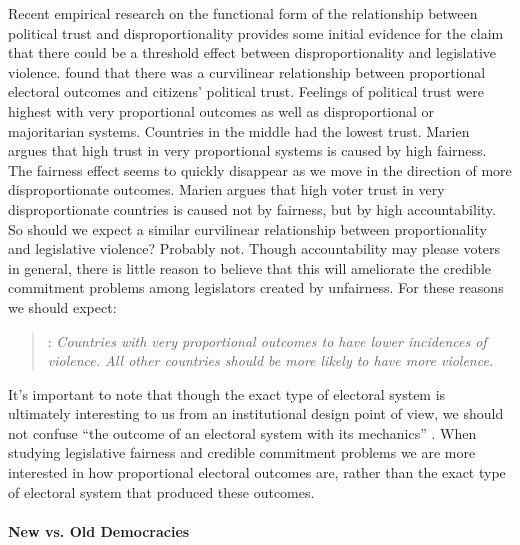 \documentclass[a4paper]{article}\usepackage[]{graphicx}\usepackage[]{color}
\begin{document}
Recent empirical research on the functional form of the relationship between political trust and disproportionality provides some initial evidence for the claim that there could be a threshold effect between disproportionality and legislative violence. \cite{Marien2011} found that there was a curvilinear relationship between proportional electoral outcomes and citizens' political trust. Feelings of political trust were highest with very proportional outcomes as well as disproportional or majoritarian systems. Countries in the middle had the lowest trust. Marien argues that high trust in very proportional systems is caused by high fairness. The fairness effect seems to quickly disappear as we move in the direction of more disproportionate outcomes. Marien argues that high voter trust in very disproportionate countries is caused not by fairness, but by high accountability. So should we expect a similar curvilinear relationship between proportionality and legislative violence? Probably not. Though accountability may please voters in general, there is little reason to believe that this will ameliorate the credible commitment problems among legislators created by unfairness. For these reasons we should expect:

\begin{quote}
    : \emph{Countries with very proportional outcomes to have lower incidences of violence. All other countries should be more likely to have more violence.}
\end{quote}

It's important to note that though the exact type of electoral system is ultimately interesting to us from an institutional design point of view, we should not confuse ``the outcome of an electoral system with its mechanics'' \citep[][109]{Golder2005}. When studying legislative fairness and credible commitment problems we are more interested in how proportional electoral outcomes are, rather than the exact type of electoral system that produced these outcomes.

\paragraph{New vs. Old Democracies}
\end{document}
